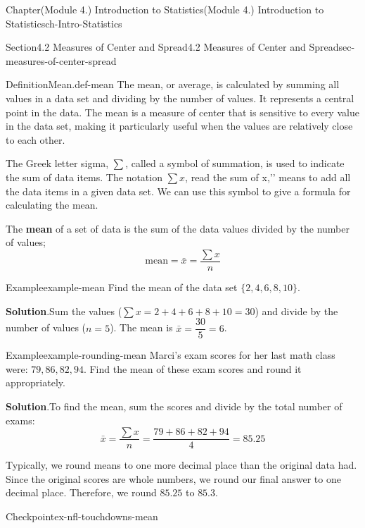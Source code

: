 \documentclass[oneside,10pt,]{book}
\newcommand{\blocktitlefont}{\relax}
\newcommand{\terminology}[1]{\textbf{#1}}
\begin{document}
\begin{chapterptx}{Chapter}{(Module 4.) Introduction to Statistics}{}{(Module 4.) Introduction to Statistics}{}{}{ch-Intro-Statistics}
\begin{sectionptx}{Section}{4.2 Measures of Center and Spread}{}{4.2 Measures of Center and Spread}{}{}{sec-measures-of-center-spread}
\begin{definition}{Definition}{Mean.}{def-mean}%
The mean, or average, is calculated by summing all values in a data set and dividing by the number of values. It represents a central point in the data. The mean is a measure of center that is sensitive to every value in the data set, making it particularly useful when the values are relatively close to each other.%
\par
The Greek letter sigma, \(\sum \), called a symbol of summation, is used to indicate the sum of data items. The notation \(\sum x\), read \textasciigrave{}\textasciigrave{}the sum of x,'{}'{} means to add all the data items in a given data set. We can use this symbol to give a formula for calculating the mean.%
\par
The \terminology{mean} of a set of data is the sum of the data values divided by the number of values;%
\begin{equation*}
\text{mean}= \bar{x}= \dfrac{\sum x}{n} 
\end{equation*}
%
\end{definition}
\begin{example}{Example}{}{example-mean}%
Find the mean of the data set \(\{2, 4, 6, 8, 10\}\).%
\par\smallskip%
\noindent\textbf{\blocktitlefont Solution}.\hypertarget{example-mean-2}{}\quad{}Sum the values (\(\sum x = 2 + 4 + 6 + 8 + 10 = 30\)) and divide by the number of values (\(n = 5\)). The mean is \(\bar{x} = \dfrac{30}{5} = 6\).%
\end{example}
\begin{example}{Example}{}{example-rounding-mean}%
Marci's exam scores for her last math class were: \(79, 86, 82, 94\). Find the mean of these exam scores and round it appropriately.%
\par\smallskip%
\noindent\textbf{\blocktitlefont Solution}.\hypertarget{example-rounding-mean-2}{}\quad{}To find the mean, sum the scores and divide by the total number of exams:%
\begin{equation*}
\bar{x}= \dfrac{\sum x}{n} = \dfrac{79 + 86 + 82 + 94}{4} = 85.25
\end{equation*}
%
\par
Typically, we round means to one more decimal place than the original data had. Since the original scores are whole numbers, we round our final answer to one decimal place. Therefore, we round \(85.25\) to \(85.3\).%
\end{example}
\begin{inlineexercise}{Checkpoint}{}{ex-nfl-touchdowns-mean}%

\end{inlineexercise}
\end{sectionptx}
\end{chapterptx}
\end{document}
